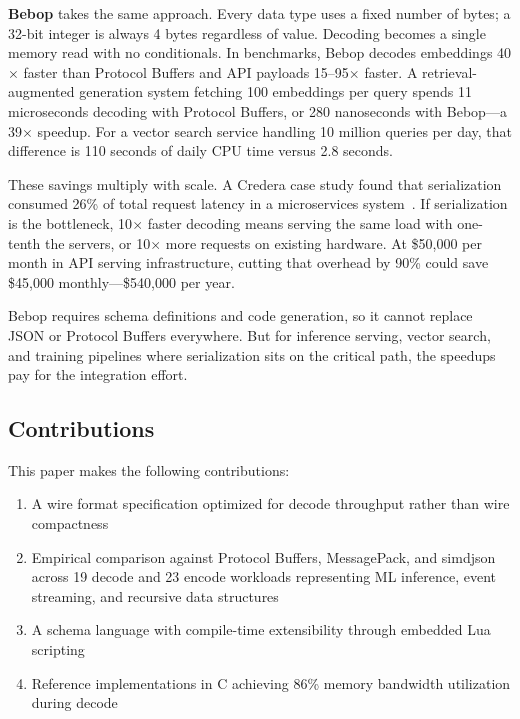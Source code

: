 \documentclass[11pt,onecolumn]{article}
\begin{document}
\textbf{Bebop} takes the same approach. Every data type uses a fixed number of bytes; a 32-bit integer is always 4 bytes regardless of value. Decoding becomes a single memory read with no conditionals. In benchmarks, Bebop decodes embeddings 40$\times$ faster than Protocol Buffers and API payloads 15--95$\times$ faster. A retrieval-augmented generation system fetching 100 embeddings per query spends 11 microseconds decoding with Protocol Buffers, or 280 nanoseconds with Bebop---a 39$\times$ speedup. For a vector search service handling 10 million queries per day, that difference is 110 seconds of daily CPU time versus 2.8 seconds.

These savings multiply with scale. A Credera case study found that serialization consumed 26\% of total request latency in a microservices system~\cite{credera-serialization}. If serialization is the bottleneck, 10$\times$ faster decoding means serving the same load with one-tenth the servers, or 10$\times$ more requests on existing hardware. At \$50,000 per month in API serving infrastructure, cutting that overhead by 90\% could save \$45,000 monthly---\$540,000 per year.

Bebop requires schema definitions and code generation, so it cannot replace JSON or Protocol Buffers everywhere. But for inference serving, vector search, and training pipelines where serialization sits on the critical path, the speedups pay for the integration effort.

\subsection{Contributions}

\begin{minipage}{\textwidth}
This paper makes the following contributions:

\begin{enumerate}[leftmargin=2em,itemsep=4pt,topsep=8pt]
\item A wire format specification optimized for decode throughput rather than wire compactness
\item Empirical comparison against Protocol Buffers, MessagePack, and simdjson across 19 decode and 23 encode workloads representing ML inference, event streaming, and recursive data structures
\item A schema language with compile-time extensibility through embedded Lua scripting
\item Reference implementations in C achieving 86\% memory bandwidth utilization during decode
\end{enumerate}
\end{minipage}
\end{document}
